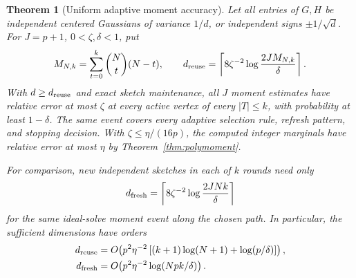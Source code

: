 \documentclass[11pt]{article}
\newtheorem{theorem}{Theorem}
\begin{document}
\begin{theorem}[Uniform adaptive moment accuracy]
\label{thm:adaptivehybridjl}
Let all entries of $G,H$ be independent centered Gaussians of
variance $1/d$, or independent signs $\pm1/\sqrt d$.
For $J=p+1$, $0<\zeta,\delta<1$, put
\[
 M_{N,k}=\sum_{t=0}^k\binom Nt(N-t),\qquad
 d_{\rm reuse}=\left\lceil
    8\zeta^{-2}\log\frac{2JM_{N,k}}{\delta}\right\rceil.
\]
With $d\geq d_{\rm reuse}$ and exact sketch maintenance,
all $J$ moment estimates have relative error at most $\zeta$
at every active vertex of every $|T|\leq k$, with probability
at least $1-\delta$. The same event covers every adaptive
selection rule, refresh pattern, and stopping decision.
With $\zeta\leq\eta/(16p)$, the computed integer marginals
have relative error at most $\eta$ by
Theorem~\ref{thm:polymoment}.

For comparison, new independent sketches in each of $k$ rounds
need only
\[
 d_{\rm fresh}=\left\lceil
       8\zeta^{-2}\log\frac{2JNk}{\delta}\right\rceil
\]
for the same ideal-solve moment event along the chosen path.
In particular, the sufficient dimensions have orders
\begin{align*}
 d_{\rm reuse}
 &=O\!\left(p^2\eta^{-2}
       \left[(k+1)\log(N+1)+\log(p/\delta)\right]\right),\\
 d_{\rm fresh}
 &=O\!\left(p^2\eta^{-2}\log(Npk/\delta)\right).
\end{align*}
\end{theorem}
\end{document}
